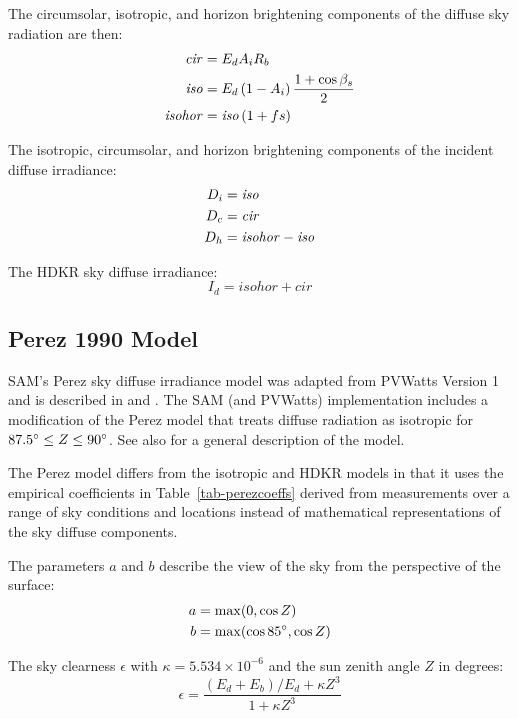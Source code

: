 \documentclass[12pt,letterpaper]{article}
\begin{document}
The circumsolar, isotropic, and horizon brightening components of the diffuse sky radiation are then:
\begin{align}
\mathit{cir} &= E_d A_i R_b \notag\\
\mathit{iso} &= E_d \left( 1 - A_i \right) \frac{1 + \cos \beta_s}{2} \notag\\
\mathit{isohor} &= \mathit{iso} \left( 1 + f s \right)
\end{align}

The isotropic, circumsolar, and horizon brightening components of the incident diffuse irradiance:
\begin{align}
D_i &= \mathit{iso} \notag\\
D_c &= \mathit{cir} \notag\\
D_h &= \mathit{isohor} - \mathit{iso}
\end{align}

The HDKR sky diffuse irradiance:
\begin{equation}
I_d = \mathit{isohor} + \mathit{cir}
\end{equation}

\subsection{Perez 1990 Model}\label{sec-perez}

SAM's Perez sky diffuse irradiance model was adapted from PVWatts Version 1 \citep{dobos2013a} and is described in \citet{perez1988} and \citep{perez1990}. The SAM (and PVWatts) implementation includes a modification of the Perez model that treats diffuse radiation as isotropic for $87.5\degree \leq Z \leq 90\degree$. See also \citep{pvmcperez} for a general description of the model.

The Perez model differs from the isotropic and HDKR models in that it uses the empirical  coefficients in Table~\ref{tab-perezcoeffs} derived from measurements over a range of sky conditions and locations instead of mathematical representations of the sky diffuse components.

The parameters $a$ and $b$ describe the view of the sky from the perspective of the surface:
\begin{align}
a &= \max( 0, \cos Z ) \notag\\
b & =\max( \cos85\degree, \cos Z) 
\end{align}

The sky clearness $\epsilon$ with $\kappa=5.534\times10^{-6}$ and the sun zenith angle
 $Z$ in degrees:
\begin{equation}\label{eqn-perezepsilon}
\epsilon =\frac{(E_d + E_b ) / E_d + \kappa Z^{3} }{1 +  \kappa Z^{3}}
\end{equation}
\end{document}
